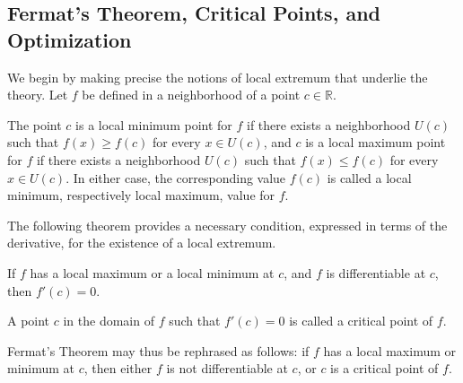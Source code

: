 \subsection{Fermat's Theorem, Critical Points, and Optimization}

We begin by making precise the notions of local extremum that underlie the theory. Let $f$ be defined in a neighborhood of a point $c \in \mathbb{R}$.

\begin{definition}
The point $c$ is a local minimum point for $f$ if there exists a neighborhood $U(c)$ such that $f(x) \geq f(c)$ for every $x \in U(c)$, and $c$ is a local maximum point for $f$ if there exists a neighborhood $U(c)$ such that $f(x) \leq f(c)$ for every $x \in U(c)$. In either case, the corresponding value $f(c)$ is called a local minimum, respectively local maximum, value for $f$.
\end{definition}

The following theorem provides a necessary condition, expressed in terms of the derivative, for the existence of a local extremum.

\begin{theorem}
If $f$ has a local maximum or a local minimum at $c$, and $f$ is differentiable at $c$, then $f'(c) = 0$.
\end{theorem}

\begin{definition}
A point $c$ in the domain of $f$ such that $f'(c) = 0$ is called a critical point of $f$.
\end{definition}

Fermat's Theorem may thus be rephrased as follows: if $f$ has a local maximum or minimum at $c$, then either $f$ is not differentiable at $c$, or $c$ is a critical point of $f$.

